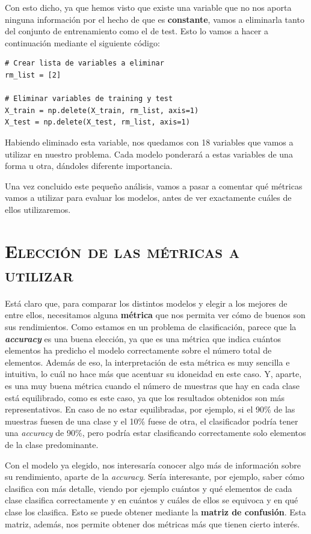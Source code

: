 \documentclass[11pt,a4paper]{article}
\begin{document}
Con esto dicho, ya que hemos visto que existe una variable que no nos aporta ninguna información por el hecho de que es \textbf{constante}, vamos
a eliminarla tanto del conjunto de entrenamiento como el de test. Esto lo vamos a hacer a continuación mediante el siguiente código:

\begin{lstlisting}
# Crear lista de variables a eliminar
rm_list = [2]

# Eliminar variables de training y test
X_train = np.delete(X_train, rm_list, axis=1)
X_test = np.delete(X_test, rm_list, axis=1)
\end{lstlisting}

Habiendo eliminado esta variable, nos quedamos con 18 variables que vamos a utilizar en nuestro problema. Cada modelo ponderará a estas
variables de una forma u otra, dándoles diferente importancia.

Una vez concluido este pequeño análisis, vamos a pasar a comentar qué métricas vamos a utilizar para evaluar los modelos, antes de ver
exactamente cuáles de ellos utilizaremos.

\newpage

\section{\textsc{Elección de las métricas a utilizar}}

Está claro que, para comparar los distintos modelos y elegir a los mejores de entre ellos, necesitamos alguna \textbf{métrica} que nos permita
ver cómo de buenos son sus rendimientos. Como estamos en un problema de clasificación, parece que la \textbf{\textit{accuracy}} es una buena
elección, ya que es una métrica que indica cuántos elementos ha predicho el modelo correctamente sobre el número total de elementos. Además
de eso, la interpretación de esta métrica es muy sencilla e intuitiva, lo cuál no hace más que acentuar su idoneidad en este caso. Y,
aparte, es una muy buena métrica cuando el número de muestras que hay en cada clase está equilibrado, como es este caso, ya que los
resultados obtenidos son más representativos. En caso de no estar equilibradas, por ejemplo, si el 90\% de las muestras fuesen de una clase
y el 10\% fuese de otra, el clasificador podría tener una \textit{accuracy} de 90\%, pero podría estar clasificando correctamente solo
elementos de la clase predominante.

Con el modelo ya elegido, nos interesaría conocer algo más de información sobre su rendimiento, aparte de la \textit{accuracy}. Sería
interesante, por ejemplo, saber cómo clasifica con más detalle, viendo por ejemplo cuántos y qué elementos de cada clase clasifica
correctamente y en cuántos y cuáles de ellos se equivoca y en qué clase los clasifica. Esto se puede obtener mediante la
\textbf{matriz de confusión}. Esta matriz, además, nos permite obtener dos métricas más que tienen cierto interés.
\end{document}
